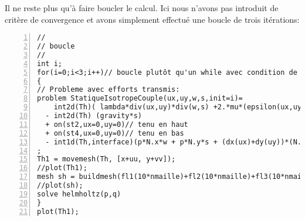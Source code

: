 \medskip
Il ne reste plus qu'à faire boucler le calcul. Ici nous n'avons pas introduit de critère de convergence et avons simplement effectué une boucle de trois itérations:
\scriptsize
\begin{Verbatim}[numbers=left,numbersep=3pt,firstnumber=last]
//
// boucle
//
int i;
for(i=0;i<3;i++)// boucle plutôt qu'un while avec condition de sortie basée sur convergence
{
// Probleme avec efforts transmis:
problem StatiqueIsotropeCouple(ux,uy,w,s,init=i)=
	int2d(Th)( lambda*div(ux,uy)*div(w,s) +2.*mu*(epsilon(ux,uy)'*epsilon(w,s)) )
  - int2d(Th) (gravity*s)
  + on(st2,ux=0,uy=0)// tenu en haut
  + on(st4,ux=0,uy=0)// tenu en bas
  - int1d(Th,interface)(p*N.x*w + p*N.y*s + (dx(ux)+dy(uy))*(N.y*w+N.x*s) )
;
Th1 = movemesh(Th, [x+uu, y+vv]);
//plot(Th1);
mesh sh = buildmesh(fl1(10*nmaille)+fl2(10*nmaille)+fl3(10*nmaille)+fl4(10*nmaille));
//plot(sh);
solve helmholtz(p,q)
}
plot(Th1);
\end{Verbatim}
\normalsize
